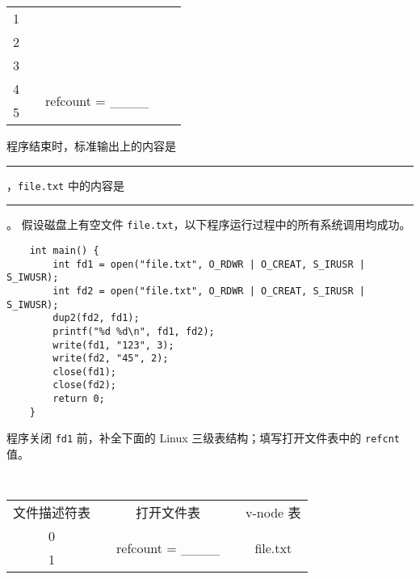 \begin{problems}
\begin{table}[H]
\begin{tabular}{ccccc}
                \multicolumn{1}{|c|}{1} & \multicolumn{1}{c|}{} & \multicolumn{1}{c|}{} & \multicolumn{1}{c|}{} & \multicolumn{1}{c|}{} \\ \cline{1-1} \cline{3-3}
                \multicolumn{1}{|c|}{2} &  &  & \multicolumn{1}{c|}{} & \multicolumn{1}{c|}{} \\ \cline{1-1}
                \multicolumn{1}{|c|}{3} &  &  & \multicolumn{1}{c|}{} & \multicolumn{1}{c|}{} \\ \cline{1-1} \cline{3-3}
                \multicolumn{1}{|c|}{4} & \multicolumn{1}{c|}{} & \multicolumn{1}{c|}{\multirow{2}{*}{refcount = \_\_\_\_}} & \multicolumn{1}{c|}{} & \multicolumn{1}{c|}{} \\ \cline{1-1}
                \multicolumn{1}{|c|}{5} & \multicolumn{1}{c|}{} & \multicolumn{1}{c|}{} & \multicolumn{1}{c|}{} & \multicolumn{1}{c|}{} \\ \cline{1-1} \cline{3-3} \cline{5-5} 
            \end{tabular}
        \end{table}
        \qn 程序结束时，标准输出上的内容是 \rule{3.5cm}{0.25mm}，\verb|file.txt| 中的内容是 \rule{3.5cm}{0.25mm}。
        \pro 假设磁盘上有空文件 \verb|file.txt|，以下程序运行过程中的所有系统调用均成功。
        \begin{verbatim}
    int main() {
        int fd1 = open("file.txt", O_RDWR | O_CREAT, S_IRUSR | S_IWUSR); 
        int fd2 = open("file.txt", O_RDWR | O_CREAT, S_IRUSR | S_IWUSR); 
        dup2(fd2, fd1);
        printf("%d %d\n", fd1, fd2);
        write(fd1, "123", 3);
        write(fd2, "45", 2);
        close(fd1);
        close(fd2);
        return 0;
    }
        \end{verbatim}
        \qn 程序关闭 \verb|fd1| 前，补全下面的 Linux 三级表结构；填写打开文件表中的 \verb|refcnt| 值。
        \begin{table}[H]
            \tt
            \centering
            \begin{tabular}{ccccc}
                文件描述符表 & {\qquad \qquad \qquad} & 打开文件表 & {\qquad \qquad \qquad} & v-node 表 \\ \cline{1-1} \cline{3-3} \cline{5-5} 
                \multicolumn{1}{|c|}{0} & \multicolumn{1}{c|}{} & \multicolumn{1}{c|}{\multirow{2}{*}{refcount = \_\_\_\_}} & \multicolumn{1}{c|}{} & \multicolumn{1}{c|}{\multirow{6}{*}{file.txt}} \\ \cline{1-1}
                \multicolumn{1}{|c|}{1} & \multicolumn{1}{c|}{} & \multicolumn{1}{c|}{} & \multicolumn{1}{c|}{} & \multicolumn{1}{c|}{} \\ \cline{1-1} \cline{3-3}

\end{tabular}
\end{table}
\end{problems}
